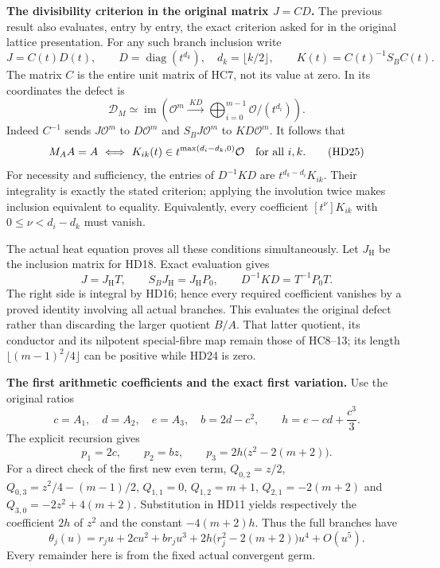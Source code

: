 \documentclass[11pt,a4paper]{article}
\theoremstyle{definition}\newtheorem{definition}[theorem]{Definition}
\begin{document}
\HD\textbf{The divisibility criterion in the original matrix $J=CD$.}
The previous result also evaluates, entry by entry, the exact
criterion asked for in the original lattice presentation.
For any such branch inclusion write
\[
 J=C(t)D(t),\qquad
 D=\operatorname{diag}(t^{d_k}),\quad d_k=\lfloor k/2\rfloor,
 \qquad K(t)=C(t)^{-1}S_BC(t).
 \tag{HD23}
\]
The matrix $C$ is the entire unit matrix of HC7, not its value at zero.
In its coordinates the defect is
\[
 \mathcal D_M\simeq
 \operatorname{im}\left(
  \mathcal O^m\xrightarrow{\ KD\ }
       \bigoplus_{i=0}^{m-1}\mathcal O/(t^{d_i})\right).
 \tag{HD24}\label{hd:criterion-module}
\]
Indeed $C^{-1}$ sends $J\mathcal O^m$ to $D\mathcal O^m$ and
$S_BJ\mathcal O^m$ to $KD\mathcal O^m$.
It follows that
\[
 M_AA=A
 \ \Longleftrightarrow\
 K_{ik}(t)\in t^{\max(d_i-d_k,0)}\mathcal O
          \quad\hbox{for all }i,k.
 \tag{HD25}\label{hd:criterion}
\]
For necessity and sufficiency, the entries of
$D^{-1}KD$ are $t^{d_k-d_i}K_{ik}$.
Their integrality is exactly the stated criterion; applying the
involution twice makes inclusion equivalent to equality.
Equivalently, every coefficient
$[t^\nu]K_{ik}$ with $0\le\nu<d_i-d_k$ must vanish.

The actual heat equation proves all these conditions simultaneously.
Let $J_{\mathrm H}$ be the inclusion matrix for HD18. Exact evaluation
gives
\[
 J=J_{\mathrm H}T,\qquad
 S_BJ_{\mathrm H}=J_{\mathrm H}P_0,\qquad
 D^{-1}KD=T^{-1}P_0T .
 \tag{HD26}\label{hd:Jidentity}
\]
The right side is integral by HD16; hence every required coefficient
vanishes by a proved identity involving all actual branches.
This evaluates the original defect rather than discarding the
larger quotient $B/A$. That latter quotient, its conductor and
its nilpotent special-fibre map remain those of HC8--13; its length
$\lfloor(m-1)^2/4\rfloor$ can be positive while HD24 is zero.

\HD\textbf{The first arithmetic coefficients and the exact first variation.}
Use the original ratios
\[
 c=A_1,\quad d=A_2,\quad e=A_3,\quad
 b=2d-c^2,\qquad h=e-cd+\frac{c^3}{3}.
 \tag{HD27}
\]
The explicit recursion gives
\[
 p_1=2c,\qquad p_2=bz,\qquad
 p_3=2h\bigl(z^2-2(m+2)\bigr).
 \tag{HD28}\label{hd:firstcoeffs}
\]
For a direct check of the first new even term,
$Q_{0,2}=z/2$,
$Q_{0,3}=z^2/4-(m-1)/2$,
$Q_{1,1}=0$, $Q_{1,2}=m+1$,
$Q_{2,1}=-2(m+2)$ and
$Q_{3,0}=-2z^2+4(m+2)$.
Substitution in HD11 yields respectively the coefficient
$2h$ of $z^2$ and the constant $-4(m+2)h$.
Thus the full branches have
\[
 \theta_j(u)=r_ju+2cu^2+b r_ju^3
             +2h\bigl(r_j^2-2(m+2)\bigr)u^4+O(u^5).
 \tag{HD29}
\]
Every remainder here is from the fixed actual convergent germ.
\end{document}
